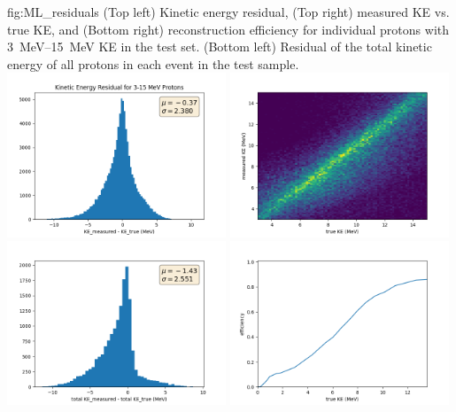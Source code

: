 \begin{dunefigure}{fig:ML_residuals}
{(Top left) Kinetic energy residual, (Top right) measured KE vs. true KE, and (Bottom right) reconstruction efficiency for individual protons with \SIrange{3}{15}{MeV} KE in the test set.  (Bottom left) Residual of the total kinetic energy of all protons in each event in the test sample.}
    \includegraphics[width=0.49\textwidth]{graphics/residuals_hist_KE.png}                                                    
    \includegraphics[width=0.49\textwidth]{graphics/pred_true_2D_KE_hist.png}
    \vspace{1mm}
    \includegraphics[width=0.49\textwidth]{graphics/total_KE_residual.png}
    \includegraphics[width=0.49\textwidth]{graphics/efficiency_wasgood_KE.png}
\end{dunefigure}
%
%


